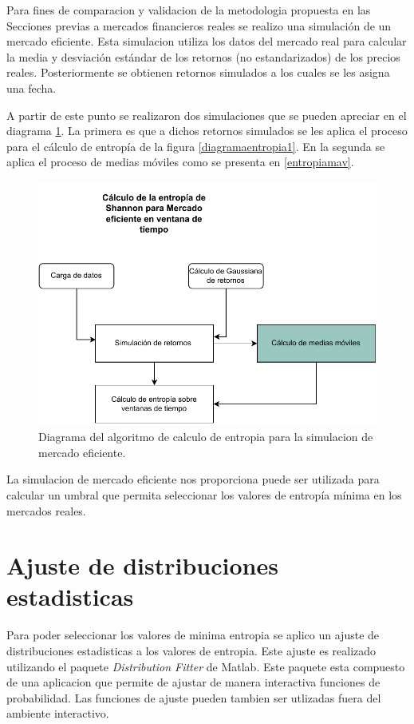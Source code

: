 Para fines de comparacion y validacion de la metodologia propuesta en las Secciones previas a mercados financieros reales se realizo una simulación de un mercado eficiente.
Esta simulacion utiliza los datos del mercado real para calcular la media y desviación estándar  de los retornos (no estandarizados) de los precios reales. 
Posteriormente se obtienen retornos simulados a los cuales se les asigna una fecha.

A partir de este punto se realizaron dos simulaciones que se pueden apreciar en el diagrama \ref{simulacion}.
La primera es que a dichos retornos simulados se les aplica el proceso para el cálculo de entropía de la figura \ref{diagramaentropia1}.
En la segunda se aplica el proceso de medias móviles como se presenta en \ref{entropiamav}.

\begin{figure}
	\centering
	\includegraphics[width=0.9\linewidth]{figures/simulacion}
	\caption{Diagrama del algoritmo de calculo de entropia para la simulacion de mercado eficiente. }
	\label{simulacion}
\end{figure}

La simulacion de mercado eficiente nos proporciona puede ser utilizada para calcular un umbral que permita seleccionar los valores de entropía mínima en los mercados reales. 
 
\section{Ajuste de distribuciones estadisticas}

Para poder seleccionar los valores de minima entropia se aplico un ajuste de distribuciones estadisticas a los valores de entropia.
Este ajuste es realizado utilizando el paquete \textit{Distribution Fitter} de Matlab.
Este paquete esta compuesto de una aplicacion que permite de ajustar de manera interactiva funciones de probabilidad.
Las funciones de ajuste pueden tambien ser utlizadas fuera del ambiente interactivo.


